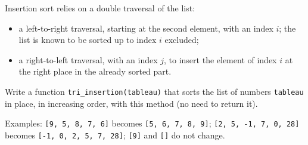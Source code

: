 Insertion sort relies on a double traversal of the list:
\begin{itemize}
\item a left-to-right traversal, starting at the second element, with an index $i$; the list is known to be sorted up to index $i$ excluded;
\item a right-to-left traversal, with an index $j$, to insert the element of index $i$ at the right place in the already sorted part.
\end{itemize}
Write a function \texttt{tri\_insertion(tableau)} that sorts the list of numbers \texttt{tableau} in place, in increasing order, with this method (no need to return it).

Examples: \texttt{[9, 5, 8, 7, 6]} becomes \texttt{[5, 6, 7, 8, 9]}; \texttt{[2, 5, -1, 7, 0, 28]} becomes \texttt{[-1, 0, 2, 5, 7, 28]}; \texttt{[9]} and \texttt{[]} do not change.

